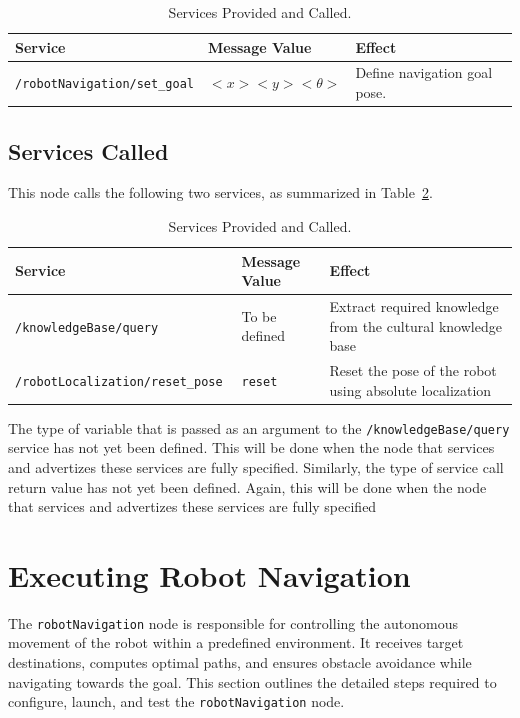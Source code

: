 \documentclass{CSSRforAfrica}
\begin{document}
\begin{table}[H]
\centering
\caption{Services Provided and Called.}
\label{tab:services supported}
\begin{tabularx}{\textwidth}{|l|l|X|}
\hline
\textbf{Service} & \textbf{Message Value} & \textbf{Effect} \\ \hline
\verb|/robotNavigation/set_goal| & \(<x> <y> <\theta>\) & Define navigation goal pose. \\ \hline
\end{tabularx}
\end{table}

\subsection*{Services Called}
This node calls the following two services, as summarized in Table~\ref{tab:services called}.

\begin{table}[H]
\centering
\caption{Services Provided and Called.}
\label{tab:services called}
\begin{tabularx}{\textwidth}{|l|l|X|}
\hline
\textbf{Service} & \textbf{Message Value} & \textbf{Effect} \\ \hline
\verb|/knowledgeBase/query | & To be defined & Extract required knowledge from the cultural
knowledge base \\ \hline
\verb|/robotLocalization/reset_pose  | & \verb|reset| & Reset the pose of the robot using absolute localization \\ \hline
\end{tabularx}
\end{table}


\noindent The type of variable that is passed as an argument to the \verb|/knowledgeBase/query| service has not yet been defined. This will be done when the node that services and advertizes these services are fully specified. Similarly, the type of service call return value has not yet been defined. Again, this will be done when the node that services and advertizes these services are fully specified

\newpage

\section{Executing Robot Navigation}
The \verb|robotNavigation| node is responsible for controlling the autonomous movement of the robot within a predefined environment. It receives target destinations, computes optimal paths, and ensures obstacle avoidance while navigating towards the goal. This section outlines the detailed steps required to configure, launch, and test the \verb|robotNavigation| node.
\end{document}
